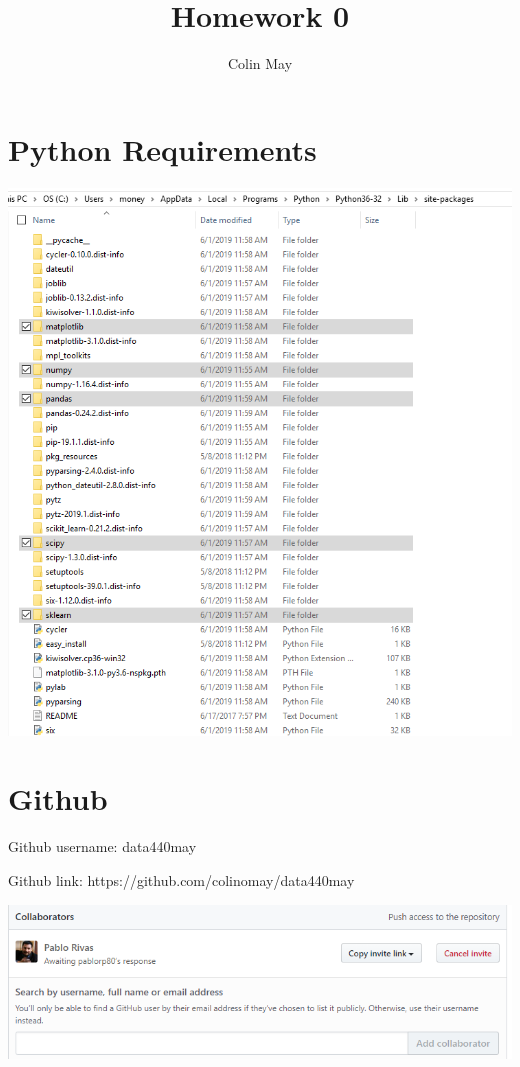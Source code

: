 \documentclass[a4paper]{article}
\title{Homework 0}
\author{Colin May}
\date{}
\begin{document}
\lstset{language=Python}

\maketitle

\section{Python Requirements}
\includegraphics[scale=0.5]{PythonPackages}

\section{Github}
Github username: data440may 

Github link: https://github.com/colinomay/data440may

\includegraphics[scale=0.5]{collabinvite}
\end{document}
